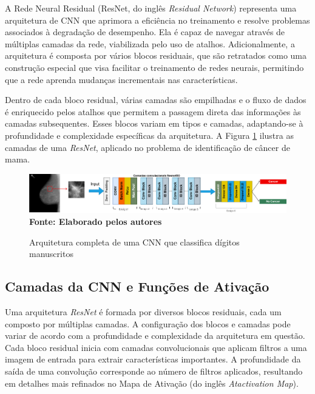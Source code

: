 
A Rede Neural Residual (ResNet, do inglês \textit{Residual Network}) representa uma arquitetura de CNN que aprimora a eficiência no treinamento e resolve problemas associados à degradação de desempenho. Ela é capaz de navegar através de múltiplas camadas da rede, viabilizada pelo uso de atalhos. Adicionalmente, a arquitetura é composta por vários blocos residuais, que são retratados como uma construção especial que visa facilitar o treinamento de redes neurais, permitindo que a rede aprenda mudanças incrementais nas características. 

Dentro de cada bloco residual, várias camadas são empilhadas e o fluxo de dados é enriquecido pelos atalhos que permitem a passagem direta das informações às camadas subsequentes. Esses blocos variam em tipos e camadas, adaptando-se à profundidade e complexidade específicas da arquitetura. A Figura \ref{fig:cnn} ilustra as camadas de uma \textit{ResNet}, aplicado no problema de identificação de câncer de mama.

\begin{figure}[ht]
 	\centering	
 	\caption[\hspace{0.1cm}Grade Computacional.]{Arquitetura completa de uma CNN que classifica dígitos manuscritos}
 	\vspace{-0.2cm}
 	\includegraphics[width=1\textwidth]{figuras/cnn.png}
 	\captionsetup{justification=centering}
	\vspace{-0.2cm}
     \\\textbf{\footnotesize Fonte: Elaborado pelos autores}
	\label{fig:cnn}
\end{figure}

\subsection{\esp Camadas da CNN e Funções de Ativação} \label{camadasfund}

Uma arquitetura \textit{ResNet} é formada por diversos blocos residuais, cada um composto por múltiplas camadas. A configuração dos blocos e camadas pode variar de acordo com a profundidade e complexidade da arquitetura em questão. Cada bloco residual inicia com camadas convolucionais que aplicam filtros a uma imagem de entrada para extrair características importantes. A profundidade da saída de uma convolução corresponde ao número de filtros aplicados, resultando em detalhes mais refinados no Mapa de Ativação (do inglês \textit{Atactivation Map}).


